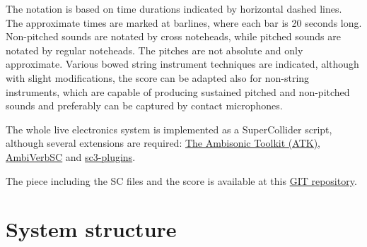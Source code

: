 \documentclass{article}
\begin{document}
The notation is based on time durations indicated by horizontal dashed lines. The approximate times are marked at barlines, where each bar is 20 seconds long.
Non-pitched sounds are notated by cross noteheads, while pitched sounds are notated by regular noteheads.
The pitches are not absolute and only approximate. Various bowed string instrument techniques are indicated,
although with slight modifications, the score can be adapted also for non-string instruments,
which are capable of producing sustained pitched and non-pitched sounds and preferably can be captured by contact microphones.

The whole live electronics system is implemented as a SuperCollider script, although several extensions are required: \href{https://github.com/ambisonictoolkit/atk-sc3}{The Ambisonic Toolkit (ATK)}, \href{https://github.com/JamesWenlock/AmbiVerbSC}{AmbiVerbSC} and \href{https://github.com/supercollider/sc3-plugins}{sc3-plugins}.

The piece including the SC files and the score is available at this \href{https://github.com/filip-dobrocky/unveil-live-electronics}{GIT repository}.

\newpage
\section*{System structure} \label{system_structure}
\end{document}
